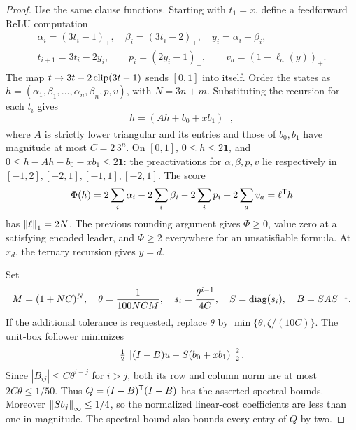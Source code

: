 \begin{proof}
Use the same clause functions. Starting with \(t_1=x\), define a feedforward
ReLU computation
\[
 \begin{gathered}
 \alpha_i=(3t_i-1)_+,\quad \beta_i=(3t_i-2)_+,\quad y_i=\alpha_i-\beta_i,\\
 t_{i+1}=3t_i-2y_i,\qquad p_i=(2y_i-1)_+,\qquad v_a=(1-\ell_a(y))_+.
 \end{gathered}
\]
The map \(t\mapsto3t-2\operatorname{clip}(3t-1)\) sends \([0,1]\) into itself.
Order the states as \(h=(\alpha_1,\beta_1,\ldots,\alpha_n,\beta_n,p,v)\),
with \(N=3n+m\). Substituting the recursion for each \(t_i\) gives
\[
 h=(Ah+b_0+xb_1)_+,
\]
where \(A\) is strictly lower triangular and its entries and those of \(b_0,b_1\)
have magnitude at most \(C=2\,3^n\). On \([0,1]\),
\(0\le h\le2\mathbf1\), and
\(0\le h-Ah-b_0-xb_1\le2\mathbf1\): the preactivations for \(\alpha,\beta,p,v\)
lie respectively in \([-1,2],[-2,1],[-1,1],[-2,1]\).
The score
\[
 \Phi(h)=2\sum_i\alpha_i-2\sum_i\beta_i-2\sum_i p_i+2\sum_a v_a
          =\ell^{\mathsf T} h
\]
has \(\left\lVert\ell\right\rVert_1=2N\). The previous rounding argument gives \(\Phi\ge0\),
value zero at a satisfying encoded leader, and \(\Phi\ge2\) everywhere for an
unsatisfiable formula. At \(x_d\), the ternary recursion gives \(y=d\).

Set
\[
 M=(1+NC)^N,\quad \theta=\frac1{100NCM},\quad
 s_i=\frac{\theta^{i-1}}{4C},\quad S=\operatorname{diag}(s_i),\quad B=SAS^{-1}.
\]
If the additional tolerance is requested, replace \(\theta\) by
\(\min\{\theta,\zeta/(10C)\}\). The unit-box follower minimizes
\begin{equation}\label{eq:scaled-network-energy}
 \tfrac12\left\lVert(I-B)u-S(b_0+xb_1)\right\rVert_2^2.
\end{equation}
Since \(|B_{ij}|\le C\theta^{i-j}\) for \(i>j\), both its row and column norm
are at most \(2C\theta\le1/50\). Thus \(Q=(I-B)^{\mathsf T}(I-B)\) has the asserted
spectral bounds. Moreover \(\left\lVert Sb_j\right\rVert_\infty\le1/4\), so the normalized
linear-cost coefficients are less than one in magnitude. The spectral bound
also bounds every entry of \(Q\) by two.


\end{proof}
